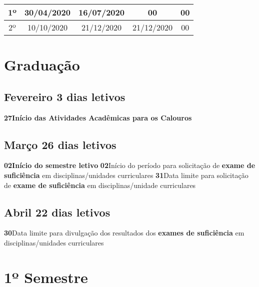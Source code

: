 \documentclass[thesis]{hmcposter}
\begin{document}
\begin{poster}
\begin{center}
\begin{table}
{\begin{tabular}{|c|c|c|c|c|}
1º & 30/04/2020 & 16/07/2020 & 00 & 00 \\ \hline
2º & 10/10/2020 & 21/12/2020 & 21/12/2020 & 00 \\ \hline
\end{tabular}
}
\end{table}
\newline
\null
\newline
\end{center}
\vfill
\null
\newpage\section{\color{hmcorange}Graduação}\subsection{Fevereiro \hfill 3 dias letivos}\textbf{27}\qquad \textbf{Início das Atividades Acadêmicas para os Calouros} \newline \null\subsection{Março \hfill 26 dias letivos}\textbf{02}\qquad \textbf{Início do semestre letivo} \newline \null\textbf{02}\qquad Início do período para solicitação de \textbf{exame de suficiência} em disciplinas/unidades curriculares \newline \null\textbf{31}\qquad Data limite para solicitação de \textbf{exame de suficiência} em disciplinas/unidade curriculares \newline \null\subsection{Abril \hfill 22 dias letivos}\textbf{30}\qquad Data limite para divulgação dos resultados dos \textbf{exames de suficiência} em disciplinas/unidades curriculares \newline \null\vfill\null
\columnbreak
\section{\hfill \color{hmcorange}1º Semestre}

\end{poster}
\end{document}
